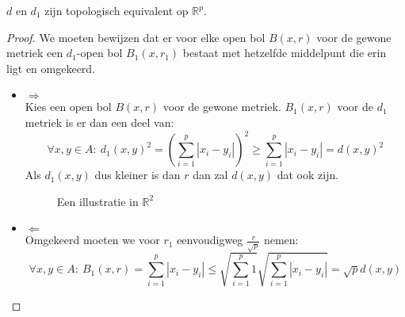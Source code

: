\documentclass[main.tex]{subfiles}
\begin{document}
\begin{st}
  $d$ en $d_{1}$ zijn topologisch equivalent op $\mathbb{R}^{p}$.

  \begin{proof}
    We moeten bewijzen dat er voor elke open bol $B(x,r)$ voor de gewone metriek een $d_{1}$-open bol $B_{1}(x,r_{1})$ bestaat met hetzelfde middelpunt die erin ligt en omgekeerd.
    \begin{itemize}
    \item $\Rightarrow$\\
      Kies een open bol $B(x,r)$ voor de gewone metriek.
      $B_{1}(x,r)$ voor de $d_{1}$ metriek is er dan een deel van:
      \[ \forall x,y\in A:\ d_{1}(x,y)^{2} = \left(\sum_{i=1}^{p}|x_{i}-y_{i}|\right)^{2} \ge \sum_{i=1}^{p}|x_{i}-y_{i}| = d(x,y)^{2} \]
      Als $d_{1}(x,y)$ dus kleiner is dan $r$ dan zal $d(x,y)$ dat ook zijn.

      \begin{figure}[H]
        \centering
        \caption{Een illustratie in $\mathbb{R}^{2}$}
      \end{figure}

    \item $\Leftarrow$\\
      Omgekeerd moeten we voor $r_{1}$ eenvoudigweg $\frac{r}{\sqrt{p}}$ nemen:
      \[ \forall x,y \in A:\ B_{1}(x,r) = \sum_{i=1}^{p}|x_{i}-y_{i}| \le \sqrt{\sum_{i=1}^{p}1} \sqrt{\sum_{i=1}^{p}|x_{i}-y_{i}|} = \sqrt{p}d(x,y) \]


\end{itemize}
\end{proof}
\end{st}
\end{document}

